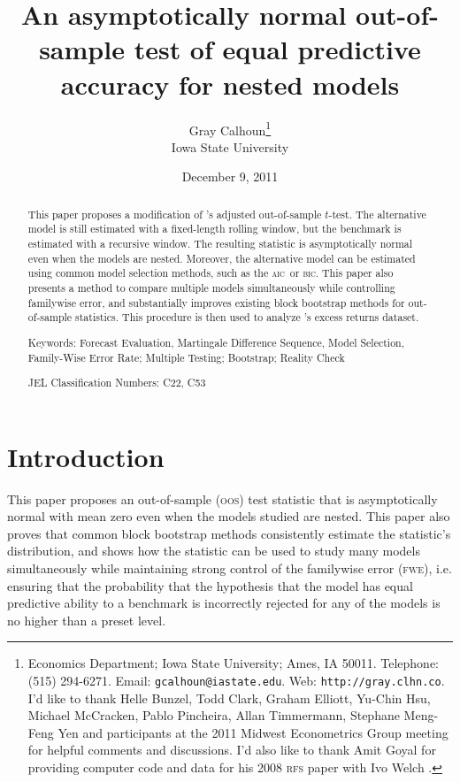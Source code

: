 \documentclass[11pt,fleqn]{article}
\newcommand\citepos[2][]{\citeauthor{#2}'s \citeyearpar[#1]{#2}}
\theoremstyle{definition}
\newcommand{\aic}{\textsc{aic}}
\newcommand{\bic}{\textsc{bic}}
\newcommand{\fwe}{\textsc{fwe}}
\newcommand{\oos}{\textsc{oos}}
\begin{document}
\author{Gray Calhoun\thanks{ Economics Department; Iowa State
    University; Ames, IA 50011.  Telephone: (515) 294-6271.  Email:
    \texttt{gcalhoun@iastate.edu}.  Web:
    \texttt{http://gray.clhn.co}.  I'd like to
    thank Helle Bunzel, Todd Clark, Graham Elliott, Yu-Chin Hsu,
    Michael McCracken, Pablo Pincheira, Allan Timmermann, Stephane
    Meng-Feng Yen and participants at the 2011 Midwest Econometrics
    Group meeting for helpful comments and discussions.  I'd also like to thank Amit
    Goyal for providing computer code and data for his 2008
    \textsc{rfs} paper with Ivo
    Welch \citep{GoW:08}.} \\
  Iowa State University}

\title{An asymptotically normal out-of-sample
  test of equal predictive accuracy for nested models} 

\date{December 9, 2011}

\maketitle

\begin{abstract} 
  \noindent This paper proposes a modification of \citepos[\textit{J.
    Econom.}]{ClW:07} adjusted out-of-sample $t$-test.  The
  alternative model is still estimated with a fixed-length rolling
  window, but the benchmark is estimated with a recursive window. The
  resulting statistic is asymptotically normal even when the models
  are nested.  Moreover, the alternative model can be estimated using
  common model selection methods, such as the \aic\ or \bic.  This
  paper also presents a method to compare multiple models
  simultaneously while controlling familywise error, and
  substantially improves existing block bootstrap methods for
  out-of-sample statistics.  This procedure is then used to analyze
  \citepos[\textit{Rev. Finan. Stud.}]{GoW:08} excess returns dataset.

\strut

\noindent Keywords: Forecast Evaluation, Martingale Difference
Sequence, Model Selection, Family-Wise Error Rate; Multiple Testing;
Bootstrap; Reality Check

\strut

\noindent JEL Classification Numbers: C22, C53

\end{abstract}

\newpage 

\section{Introduction} This paper proposes an out-of-sample (\oos)
test statistic that is asymptotically normal with mean zero even when
the models studied are nested.  This paper also proves that common
block bootstrap methods consistently estimate the statistic's
distribution, and shows how the statistic can be used to study many
models simultaneously while maintaining strong control of the
familywise error (\fwe), i.e. ensuring that the probability that the
hypothesis that the model has equal predictive ability to a benchmark
is incorrectly rejected for any of the models is no higher than a
preset level.
\end{document}
